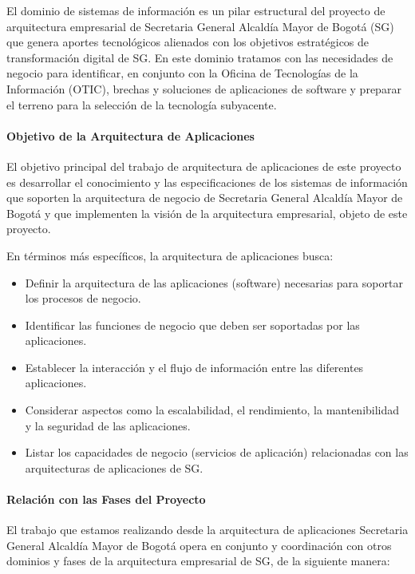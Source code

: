 \documentclass[
	a4paper, %
	12pt, %
]{include/CSSullivanBusinessReport}
\def\tightlist{}
\begin{document}
El dominio de sistemas de información es un pilar estructural del
proyecto de arquitectura empresarial de Secretaria General Alcaldía
Mayor de Bogotá (SG) que genera aportes tecnológicos alienados con los
objetivos estratégicos de transformación digital de SG. En este dominio
tratamos con las necesidades de negocio para identificar, en conjunto
con la Oficina de Tecnologías de la Información (OTIC), brechas y
soluciones de aplicaciones de software y preparar el terreno para la
selección de la tecnología subyacente.

\paragraph{Objetivo de la Arquitectura de
Aplicaciones}\label{sec:objetivo-de-la-arquitectura-de-aplicaciones}

El objetivo principal del trabajo de arquitectura de aplicaciones de
este proyecto es desarrollar el conocimiento y las especificaciones de
los sistemas de información que soporten la arquitectura de negocio de
Secretaria General Alcaldía Mayor de Bogotá y que implementen la visión
de la arquitectura empresarial, objeto de este proyecto.

En términos más específicos, la arquitectura de aplicaciones busca:

\begin{itemize}
\tightlist
\item
  Definir la arquitectura de las aplicaciones (software) necesarias para
  soportar los procesos de negocio.
\item
  Identificar las funciones de negocio que deben ser soportadas por las
  aplicaciones.
\item
  Establecer la interacción y el flujo de información entre las
  diferentes aplicaciones.
\item
  Considerar aspectos como la escalabilidad, el rendimiento, la
  mantenibilidad y la seguridad de las aplicaciones.
\item
  Listar los capacidades de negocio (servicios de aplicación)
  relacionadas con las arquitecturas de aplicaciones de SG.
\end{itemize}

\paragraph{Relación con las Fases del
Proyecto}\label{sec:relaciuxf3n-con-las-fases-del-proyecto}

El trabajo que estamos realizando desde la arquitectura de aplicaciones
Secretaria General Alcaldía Mayor de Bogotá opera en conjunto y
coordinación con otros dominios y fases de la arquitectura empresarial
de SG, de la siguiente manera:
\end{document}
